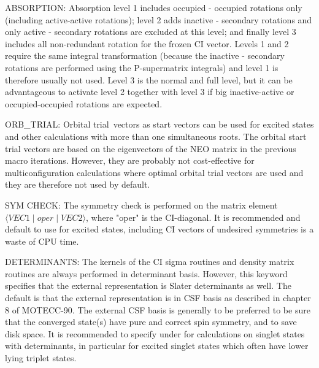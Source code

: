 ABSORPTION: Absorption level 1 includes occupied - occupied rotations
only (including active-active rotations); level 2 adds inactive -
secondary rotations and only active - secondary rotations are excluded
at this level; and finally level 3 includes all non-redundant rotation
for the frozen CI vector.  Levels 1 and 2 require the same integral
transformation (because the inactive - secondary rotations are
performed using the P-supermatrix integrals) and level 1 is therefore
usually not used. Level 3 is the normal and full level, but it can be
advantageous to activate level 2 together with level 3 if big
inactive-active or occupied-occupied rotations are expected.
 
ORB\_TRIAL: Orbital trial\ vectors as
start vectors can be used for 
excited states and other calculations with more than one simultaneous
roots.  The orbital start trial vectors are based on the eigenvectors of
the NEO matrix in the previous macro iterations.  However, they are
probably not cost-effective for multiconfiguration calculations where
optimal orbital trial vectors are
used and they are therefore not used 
by default.
 
SYM CHECK: The symmetry check is performed on the matrix element
$\langle VEC1 \mid oper \mid VEC2\rangle$, where "oper" is
the CI-diagonal.
It is recommended and default to use 
for excited states, including
CI vectors of undesired symmetries is a waste of CPU time.
 
DETERMINANTS: The kernels of the CI sigma routines and density matrix
routines are always performed in determinant
basis.  However, this 
keyword specifies that the external representation is Slater
determinants as well.  The default is that the external representation
is in CSF basis as
described in chapter 8 of MOTECC-90.  The external 
CSF basis is generally to be preferred to be sure that the converged
state(s) have pure and correct spin symmetry, and
to save disk space. 
It is recommended to specify  under 
 for
calculations on singlet states with
determinants, 
in particular for 
excited singlet states which often have lower lying triplet states.
 
 
\pagebreak[3]
\subsection{\label{ref-orbinp}}
 
